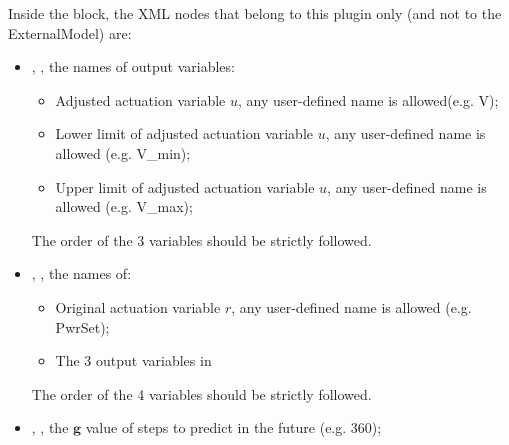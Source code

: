 Inside the  block, the XML nodes that belong to this plugin only (and not to the ExternalModel) 
are:
\begin{itemize}
  \item {}, , the names of output variables:
  \begin{itemize}
    \item Adjusted actuation variable \begin{math} u \end{math}, 
    any user-defined name is allowed(e.g. V);
    \item Lower limit of adjusted actuation variable \begin{math} u \end{math}, 
    any user-defined name is allowed (e.g. V\_min);
    \item Upper limit of adjusted actuation variable \begin{math} u \end{math}, 
    any user-defined name is allowed (e.g. V\_max);
  \end{itemize}
  The order of the 3 variables should be strictly followed.
  
  \item {}, , the names of: 
  \begin{itemize}
    \item Original actuation variable \begin{math} r \end{math}, 
    any user-defined name is allowed (e.g. PwrSet);
    \item The 3 output variables in 
  \end{itemize}
  The order of the 4 variables should be strictly followed.
  
  \item {}, ,  
  the $\textbf{g}$ value of steps to predict in the future (e.g. 360);
  

\end{itemize}
